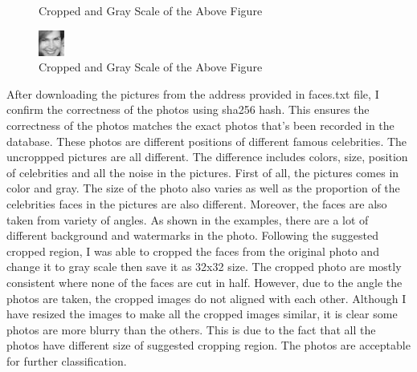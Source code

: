 \documentclass[12pt]{article} %
\begin{document}
\begin{figure}[H]
\begin{minipage}[b]{0.3\textwidth}
    \caption{Cropped and Gray Scale of the Above Figure}
  \end{minipage}
  \begin{minipage}[b]{0.3\textwidth}
    \includegraphics[width=\textwidth]{part1_2c}
    \caption{Cropped and Gray Scale of the Above Figure}
  \end{minipage}
\end{figure}


After downloading the pictures from the address provided in  faces.txt file, I confirm the correctness of the photos using sha256 hash. This ensures the correctness of the photos matches the exact photos that’s been recorded in the database. These photos are different positions of different famous celebrities. The uncroppped pictures are all different. The difference includes colors, size, position of celebrities and all the noise in the pictures. First of all, the pictures comes in color and gray. The size of the photo also varies as well as the proportion of the celebrities faces in the pictures are also different. Moreover, the faces are also taken from variety of angles. As shown in the examples, there are a lot of different background and watermarks in the photo. Following the suggested cropped region, I was able to cropped the faces from the original photo and change it to gray scale then save it as 32x32 size. The cropped photo are mostly consistent where none of the faces are cut in half. However, due to the angle the photos are taken, the cropped images do not aligned with each other. Although I have resized the images to make all the cropped images similar, it is clear some photos are more blurry than the others. This is due to the fact that all the photos have different size of suggested cropping region. The photos are acceptable for further classification. 
\end{document}
